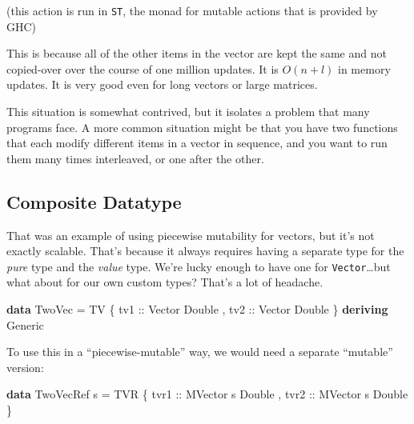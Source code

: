 \documentclass[]{article}
\newenvironment{Shaded}{}{}
\newcommand{\DataTypeTok}[1]{\textcolor[rgb]{0.56,0.13,0.00}{#1}}
\newcommand{\KeywordTok}[1]{\textcolor[rgb]{0.00,0.44,0.13}{\textbf{#1}}}
\newcommand{\NormalTok}[1]{#1}
\newcommand{\OtherTok}[1]{\textcolor[rgb]{0.00,0.44,0.13}{#1}}
\begin{document}
(this action is run in \texttt{ST}, the monad for mutable actions that is
provided by GHC)

This is because all of the other items in the vector are kept the same and not
copied-over over the course of one million updates. It is \(O(n+l)\) in memory
updates. It is very good even for long vectors or large matrices.

This situation is somewhat contrived, but it isolates a problem that many
programs face. A more common situation might be that you have two functions that
each modify different items in a vector in sequence, and you want to run them
many times interleaved, or one after the other.

\hypertarget{composite-datatype}{%
\subsection{Composite Datatype}\label{composite-datatype}}

That was an example of using piecewise mutability for vectors, but it's not
exactly scalable. That's because it always requires having a separate type for
the \emph{pure} type and the \emph{value} type. We're lucky enough to have one
for \texttt{Vector}\ldots but what about for our own custom types? That's a lot
of headache.

\begin{Shaded}
\begin{Highlighting}[]
\KeywordTok{data} \DataTypeTok{TwoVec} \OtherTok{=} \DataTypeTok{TV}\NormalTok{ \{}\OtherTok{ tv1 ::} \DataTypeTok{Vector} \DataTypeTok{Double}
\NormalTok{                 ,}\OtherTok{ tv2 ::} \DataTypeTok{Vector} \DataTypeTok{Double}
\NormalTok{                 \}}
  \KeywordTok{deriving} \DataTypeTok{Generic}
\end{Highlighting}
\end{Shaded}

To use this in a ``piecewise-mutable'' way, we would need a separate ``mutable''
version:

\begin{Shaded}
\begin{Highlighting}[]
\KeywordTok{data} \DataTypeTok{TwoVecRef}\NormalTok{ s }\OtherTok{=} \DataTypeTok{TVR}\NormalTok{ \{}\OtherTok{ tvr1 ::} \DataTypeTok{MVector}\NormalTok{ s }\DataTypeTok{Double}
\NormalTok{                       ,}\OtherTok{ tvr2 ::} \DataTypeTok{MVector}\NormalTok{ s }\DataTypeTok{Double}
\NormalTok{                       \}}
\end{Highlighting}
\end{Shaded}
\end{document}
